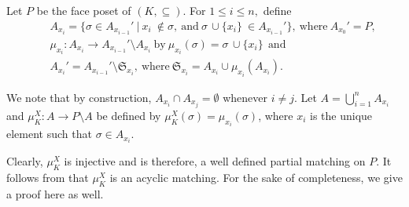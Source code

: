 \documentclass[12pt]{article}
\numberwithin{thm}{section}
\theoremstyle{definition}
\newcommand{\s}{\mathfrak{S}}
\begin{document}
  Let $P$ be the face poset of $(K, \subseteq)$.
  For  $1 \leq i \leq n ,$ define 
  \begin{eqnarray*}
  &&A_{x_i} = \{\sigma \in A_{x_{i-1}}' \ | \ x_i \ \notin \sigma , \ \text{and} \ \sigma \, \cup \{x_i \} \ \in A_{x_{i-1}}'\}, ~\text{where}~ A_{x_0}' =P, \label{am:1}\\
  &&\mu_{x_i} : A_{x_i}  \rightarrow A_{x_{i-1}}' \setminus A_{x_i} ~\text{by} ~  \mu_{x_i}(\sigma) = \sigma \, \cup \{x_i\}~~\text{and}\label{am:2}\\
  &&A_{x_i}'= A_{x_{i-1}}' \setminus \s_{x_i}, ~\text{where}~ \s_{x_i} = A_{x_i}\cup \mu_{x_i} (A_{x_i}).\label{am:3}
  \end{eqnarray*}
  
  We note that by construction, $A_{x_i} \cap A_{x_j} =\emptyset$ whenever $ i \neq j$.
  Let $A = \bigcup \limits_{i=1}^{n} A_{x_i}$ and $\mu_K^{X}: A \rightarrow P \setminus A$ be defined by $\mu_K^X(\sigma) =\mu_{x_i} (\sigma)$, where $x_i$ is the unique element such that $\sigma \in A_{x_i}$.  
  

  Clearly, $\mu_K^{X}$ is  injective  and is therefore, a well defined partial matching on $P$.  It follows from \cite[Proposition 3.1]{NS} that $\mu_K^X$ is an acyclic matching. For the sake of completeness, we give a proof here as well. 
 
\end{document}
